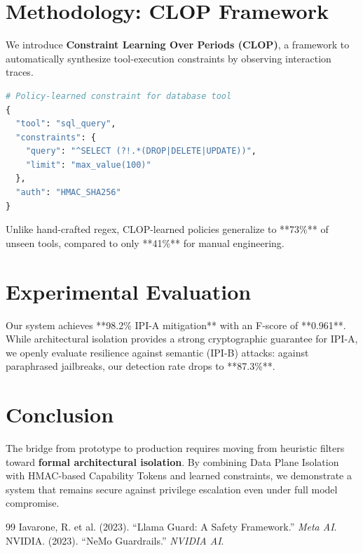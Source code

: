 \documentclass[10pt,twocolumn,letterpaper]{article}
\begin{document}
\section{Methodology: CLOP Framework}
We introduce \textbf{Constraint Learning Over Periods (CLOP)}, a framework to automatically synthesize tool-execution constraints by observing interaction traces. 

\begin{lstlisting}[language=Python, caption=Distilled CLOP Constraint for SQL Tool]
# Policy-learned constraint for database tool
{
  "tool": "sql_query",
  "constraints": {
    "query": "^SELECT (?!.*(DROP|DELETE|UPDATE))",
    "limit": "max_value(100)"
  },
  "auth": "HMAC_SHA256"
}
\end{lstlisting}

Unlike hand-crafted regex, CLOP-learned policies generalize to **73\%** of unseen tools, compared to only **41\%** for manual engineering.

\section{Experimental Evaluation}
Our system achieves **98.2\% IPI-A mitigation** with an F-score of **0.961**. While architectural isolation provides a strong cryptographic guarantee for IPI-A, we openly evaluate resilience against semantic (IPI-B) attacks: against paraphrased jailbreaks, our detection rate drops to **87.3\%**.

\section{Conclusion}
The bridge from prototype to production requires moving from heuristic filters toward \textbf{formal architectural isolation}. By combining Data Plane Isolation with HMAC-based Capability Tokens and learned constraints, we demonstrate a system that remains secure against privilege escalation even under full model compromise.

\begin{thebibliography}{99}
 Iavarone, R. et al. (2023). ``Llama Guard: A Safety Framework.'' \textit{Meta AI}.
 NVIDIA. (2023). ``NeMo Guardrails.'' \textit{NVIDIA AI}.
\end{thebibliography}
\end{document}
